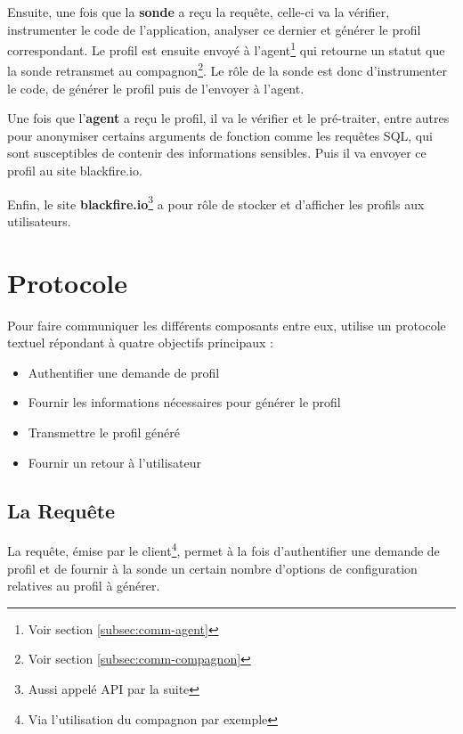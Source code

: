 Ensuite, une fois que la \textbf{sonde} a reçu la requête, celle-ci va la vérifier, instrumenter le code de l'application, analyser ce dernier et générer le profil correspondant. Le profil est ensuite envoyé à l'agent\footnote{Voir section \vref{subsec:comm-agent}} qui retourne un statut que la sonde retransmet au compagnon\footnote{Voir section \vref{subsec:comm-compagnon}}. Le rôle de la sonde est donc d'instrumenter le code, de générer le profil puis de l'envoyer à l'agent.

Une fois que l'\textbf{agent} a reçu le profil, il va le vérifier et le pré-traiter, entre autres pour anonymiser certains arguments de fonction comme les requêtes SQL, qui sont susceptibles de contenir des informations sensibles. Puis il va envoyer ce profil au site blackfire.io.

Enfin, le site \textbf{blackfire.io}\footnote{Aussi appelé API par la suite} a pour rôle de stocker et d'afficher les profils aux utilisateurs.

		\section{Protocole}
			\label{sec:BlackfireProtocol}
Pour faire communiquer les différents composants entre eux, \Blackfire utilise un protocole textuel répondant à quatre objectifs principaux :
\begin{itemize}
\item Authentifier une demande de profil
\item Fournir les informations nécessaires pour générer le profil
\item Transmettre le profil généré
\item Fournir un retour à l'utilisateur
\end{itemize}

			\subsection{La Requête}
			\label{subsec:BlackfireQuery}
La requête, émise par le client\footnote{Via l'utilisation du compagnon par exemple}, permet à la fois d'authentifier une demande de profil et de fournir à la sonde un certain nombre d'options de configuration relatives au profil à générer.

